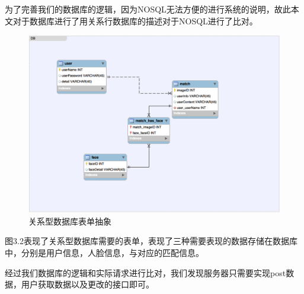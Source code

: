 为了完善我们的数据库的逻辑，因为NOSQL无法方便的进行系统的说明，故此本文对于数据库进行了用关系行数据库的描述对于NOSQL进行了比对。
\begin{figure}[h]
\centering
\includegraphics[width=\textwidth]{img/chap3/database.png}
\caption{关系型数据库表单抽象\label{Face++API}}
\end{figure}

图3.2表现了关系型数据库需要的表单，表现了三种需要表现的数据存储在数据库中，分别是用户信息，人脸信息，与对应的匹配信息。

经过我们数据库的逻辑和实际请求进行比对，我们发现服务器只需要实现post数据，用户获取数据以及更改的接口即可。








